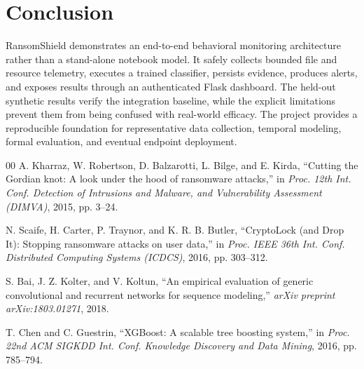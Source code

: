 \documentclass[conference]{IEEEtran}
\begin{document}
\section{Conclusion}
RansomShield demonstrates an end-to-end behavioral monitoring architecture rather
than a stand-alone notebook model. It safely collects bounded file and resource
telemetry, executes a trained classifier, persists evidence, produces alerts,
and exposes results through an authenticated Flask dashboard. The held-out
synthetic results verify the integration baseline, while the explicit limitations
prevent them from being confused with real-world efficacy. The project provides
a reproducible foundation for representative data collection, temporal modeling,
formal evaluation, and eventual endpoint deployment.

\begin{thebibliography}{00}
A. Kharraz, W. Robertson, D. Balzarotti, L. Bilge, and E. Kirda,
``Cutting the Gordian knot: A look under the hood of ransomware attacks,''
in \emph{Proc. 12th Int. Conf. Detection of Intrusions and Malware, and
Vulnerability Assessment (DIMVA)}, 2015, pp. 3--24.

N. Scaife, H. Carter, P. Traynor, and K. R. B. Butler,
``CryptoLock (and Drop It): Stopping ransomware attacks on user data,''
in \emph{Proc. IEEE 36th Int. Conf. Distributed Computing Systems (ICDCS)},
2016, pp. 303--312.

S. Bai, J. Z. Kolter, and V. Koltun,
``An empirical evaluation of generic convolutional and recurrent networks for
sequence modeling,'' \emph{arXiv preprint arXiv:1803.01271}, 2018.

T. Chen and C. Guestrin, ``XGBoost: A scalable tree boosting system,''
in \emph{Proc. 22nd ACM SIGKDD Int. Conf. Knowledge Discovery and Data Mining},
2016, pp. 785--794.
\end{thebibliography}
\end{document}
